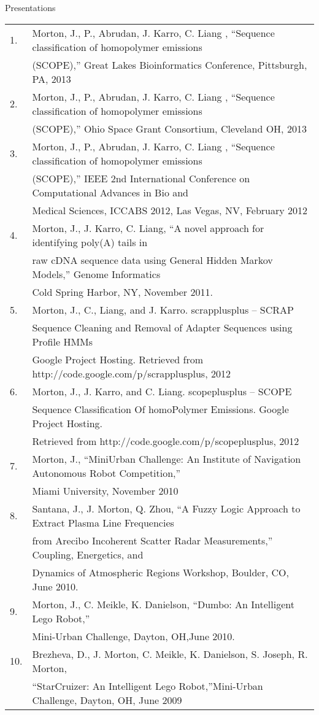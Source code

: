 \documentclass{resume} %
\begin{document}
\begin{rSection}{Presentations}
  \begin{tabular}{ll}

    1.  & Morton, J., P., Abrudan, J. Karro, C. Liang , “Sequence classification of homopolymer emissions \\
        & (SCOPE),” Great Lakes Bioinformatics Conference, Pittsburgh, PA, 2013\\
    2.  & Morton, J., P., Abrudan, J. Karro, C. Liang , “Sequence classification of homopolymer emissions \\
        & (SCOPE),” Ohio Space Grant Consortium, Cleveland OH, 2013\\
    3.  & Morton, J., P., Abrudan, J. Karro, C. Liang , “Sequence classification of homopolymer emissions \\
        & (SCOPE),” IEEE 2nd International Conference on Computational Advances in Bio and \\
        & Medical Sciences, ICCABS 2012, Las Vegas, NV, February 2012\\
    4.  & Morton, J., J. Karro, C. Liang, “A novel approach for identifying poly(A) tails in \\
        & raw cDNA sequence data using General Hidden Markov Models,” Genome Informatics \\
        & Cold Spring Harbor, NY, November 2011.\\
    5.  & Morton, J., C., Liang, and J. Karro. scrapplusplus -- SCRAP \\
        & Sequence Cleaning and Removal of Adapter Sequences using Profile HMMs\\
        & Google Project Hosting. Retrieved from http://code.google.com/p/scrapplusplus, 2012\\
    6.  & Morton, J., J. Karro, and C. Liang. scopeplusplus -- SCOPE \\
        & Sequence Classification Of homoPolymer Emissions. Google Project Hosting.\\
        & Retrieved from http://code.google.com/p/scopeplusplus, 2012\\
    7.  & Morton, J., “MiniUrban Challenge: An Institute of Navigation Autonomous Robot Competition,”\\
        & Miami University, November 2010 \\
    8.  & Santana, J., J. Morton, Q. Zhou, “A Fuzzy Logic Approach to Extract Plasma Line Frequencies\\
        & from Arecibo Incoherent Scatter Radar Measurements,” Coupling, Energetics, and \\
        & Dynamics of Atmospheric Regions Workshop, Boulder, CO, June 2010.\\
    9.  & Morton, J., C. Meikle, K. Danielson, “Dumbo: An Intelligent Lego Robot,”\\
        & Mini-Urban Challenge, Dayton, OH,June 2010.\\
    10.  & Brezheva, D., J. Morton, C. Meikle, K. Danielson, S. Joseph, R. Morton,\\
        & “StarCruizer: An Intelligent Lego Robot,”Mini-Urban Challenge, Dayton, OH, June 2009\\
  \end{tabular}
\end{rSection}
\end{document}
